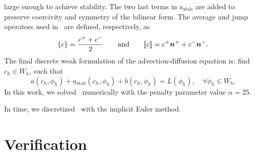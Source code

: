\documentclass{WileyMSP-template}
\begin{document}
large enough to achieve stability. The two last terms in $a_{\mathrm{stab}}$ are
added to preserve coercivity and symmetry of the bilinear form. The average and jump operators used
in~ are defined, respectively, as
\begin{equation*}
    \{c\} = \frac{c^+ + c^-}{2} \qquad\mathrm{and}\qquad \llbracket c\rrbracket = c^+\bm{n}^+ + c^-\bm{n}^-.
\end{equation*}
The final discrete weak formulation of the advection-diffusion equation is:
find $c_h\in W_h$, such that
\begin{equation}
    a(c_h, \phi_h) + a_{\mathrm{stab}}(c_h, \phi_h) + b(c_h, \phi_h) = L(\phi_h),
    \quad\forall\phi_h\in W_h.
    \label{eq:discrete_weak_form_adv_diff}
\end{equation}
In this work, we solved~ numerically
with the penalty parameter value $\alpha=25$.

In time, we discretized~ with the implicit Euler method.

\section{Verification}\label{sec:appB_verification}
\end{document}
